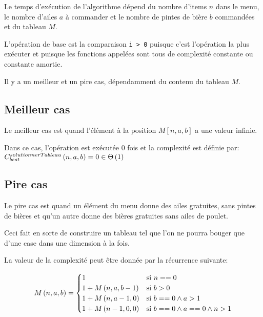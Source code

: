 \documentclass[class=article]{standalone}
\begin{document}
Le temps d'exécution de l'algorithme dépend du nombre d'items $n$ dans le menu,
le nombre d'ailes $a$ à commander et le nombre de pintes de bière $b$ commandées
et du tableau $M$.

L'opération de base est la comparaison \lstinline{i > 0} puisque c'est l'opération
la plus exécuter et puisque les fonctions appelées sont tous de complexité constante
ou constante amortie. 

Il y a un meilleur et un pire cas, dépendamment du contenu du tableau $M$.

\subsection*{Meilleur cas}

Le meilleur cas est quand l'élément à la position $M[n,a,b]$ a une valeur infinie.

Dans ce cas, l'opération est exécutée 0 fois et la complexité est définie par:
$C^{solutionnerTableau}_{best}\left ( n, a, b \right ) = 0 \in \Theta\left ( 1 \right )$

\subsection*{Pire cas}

Le pire cas est quand un élément du menu donne des ailes gratuites, sans pintes de bières
et qu'un autre donne des bières gratuites sans ailes de poulet.

Ceci fait en sorte de construire un tableau tel que l'on ne pourra bouger que d'une case
dans une dimension à la fois.

La valeur de la complexité peut être donnée par la récurrence suivante:

\[
    M\left ( n, a, b \right ) =
    \begin{cases}
        1 & \text{si } n == 0 \\
        1 + M\left ( n, a, b-1 \right ) & \text{si } b > 0 \\
        1 + M\left ( n, a-1, 0 \right ) & \text{si } b == 0 \wedge a > 1 \\
        1 + M\left ( n-1, 0, 0 \right ) & \text{si } b == 0 \wedge a == 0 \wedge n > 1 \\
    \end{cases}
\]
\end{document}
